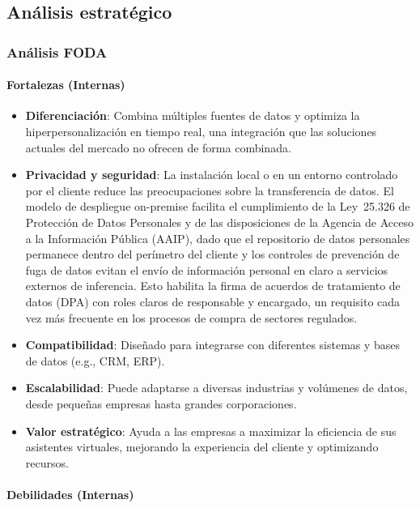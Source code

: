 \subsection{Análisis estratégico}

\subsubsection{Análisis FODA}

\paragraph{Fortalezas (Internas)}

\begin{itemize}
    \item \textbf{Diferenciación}: Combina múltiples fuentes de datos y optimiza la hiperpersonalización en tiempo real, una integración que las soluciones actuales del mercado no ofrecen de forma combinada.
    \item \textbf{Privacidad y seguridad}: La instalación local o en un entorno controlado por el cliente reduce las preocupaciones sobre la transferencia de datos. El modelo de despliegue on-premise facilita el cumplimiento de la Ley~25.326 de Protección de Datos Personales y de las disposiciones de la Agencia de Acceso a la Información Pública (AAIP), dado que el repositorio de datos personales permanece dentro del perímetro del cliente y los controles de prevención de fuga de datos evitan el envío de información personal en claro a servicios externos de inferencia. Esto habilita la firma de acuerdos de tratamiento de datos (DPA) con roles claros de responsable y encargado, un requisito cada vez más frecuente en los procesos de compra de sectores regulados.
    \item \textbf{Compatibilidad}: Diseñado para integrarse con diferentes sistemas y bases de datos (e.g., CRM, ERP).
    \item \textbf{Escalabilidad}: Puede adaptarse a diversas industrias y volúmenes de datos, desde pequeñas empresas hasta grandes corporaciones.
    \item \textbf{Valor estratégico}: Ayuda a las empresas a maximizar la eficiencia de sus asistentes virtuales, mejorando la experiencia del cliente y optimizando recursos.
\end{itemize}

\paragraph{Debilidades (Internas)}

